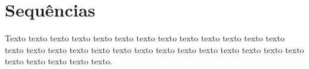 \chapter{Sequências}
\label{ape:sequencias}

Texto texto texto texto texto texto texto texto texto texto texto texto texto
texto texto texto texto texto texto texto texto texto texto texto texto texto
texto texto texto texto texto texto.



